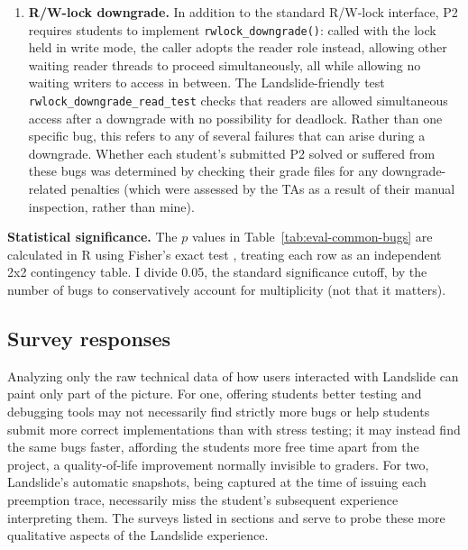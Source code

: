 \begin{enumerate}
\item
{\bf R/W-lock downgrade.}
In addition to the standard R/W-lock interface,
P2 requires students to implement {\tt rwlock\_downgrade()}:
called with the lock held in write mode,
the caller adopts the reader role instead,
allowing other waiting reader threads to proceed simultaneously,
all while allowing no waiting writers to access in between.
%
The Landslide-friendly test {\tt rwlock\_downgrade\_read\_test}
checks that readers are allowed simultaneous access after a downgrade with no possibility for deadlock.
Rather than one specific bug, this refers to any of several failures that can arise during a downgrade.
Whether each student's submitted P2 solved or suffered from these bugs
was determined by checking their grade files for any downgrade-related penalties
(which were assessed by the TAs as a result of their manual inspection, rather than mine).
\end{enumerate}

{\bf Statistical significance.}
The $p$ values
in Table~\ref{tab:eval-common-bugs}
are calculated in R \cite{r-lang} using Fisher's exact test \cite{fishers-exact-test},
treating each row as an independent 2x2 contingency table.
I divide 0.05, the standard significance cutoff,
by the number of bugs to conservatively account for multiplicity \cite{xkcd-jellybeans}
(not that it matters).

\subsection{Survey responses}
\label{sec:education-eval-survey}

Analyzing only the raw technical data of how users interacted with Landslide can paint only part of the picture.
For one, offering students better testing and debugging tools
may not necessarily find strictly more bugs or help students submit more correct implementations
than with stress testing;
it may instead find the same bugs faster,
affording the students more free time apart from the project,
a quality-of-life improvement normally invisible to graders.
For two, Landslide's automatic snapshots, being captured at the time of issuing each preemption trace,
necessarily miss the student's subsequent experience interpreting them.
The surveys listed in sections \sect{\ref{sec:education-survey-pebbles}} and \sect{\ref{sec:education-survey-pintos}}
serve to probe these more qualitative aspects of the Landslide experience.

